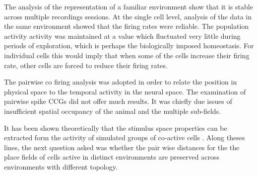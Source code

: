 The analysis of the representation of a familiar environment show that it is stable across multiple recordings sessions. At the single cell level, analysis of the data in the same environment showed that the firing rates were reliable. The population activity activity was maintained at a value which fluctuated very little during periods of exploration, which is perhaps the biologically imposed homeostasis. For individual cells this would imply that when some of the cells increase their firing rate, other cells are forced to reduce their firing rates. 

The pairwise co firing analysis was adopted in order to relate the position in physical space to the temporal activity in the neural space. The examination of pairwise spike CCGs did not offer much results. It was chiefly due issues of insufficient spatial occupancy of the animal and the multiple sub-fields. 


It has been shown theoretically that the stimulus space properties can be extracted form the activity of simulated groups of co-active cells \cite{Curto2008}. Along theses lines, the next question asked was whether the pair wise distances for the the place fields of cells active in distinct environments are preserved across environments with different topology. \\

